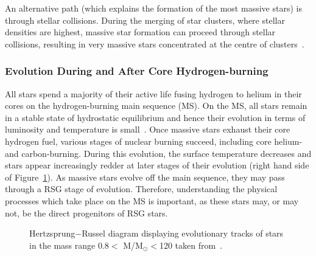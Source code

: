 \documentclass[a4paper,12pt]{article}
\begin{document}
An alternative path (which explains the formation of the most massive stars) is through stellar collisions.
During the merging of star clusters, where stellar densities are highest, massive star formation can proceed through stellar collisions, resulting in very massive stars concentrated at the centre of clusters~\citep{Fujii13}.



\subsubsection{Evolution During and After Core Hydrogen-burning}\label{stellar evolution}

All stars spend a majority of their active life fusing hydrogen to helium in their cores on the hydrogen-burning main sequence (MS).
On the MS, all stars remain in a stable state of hydrostatic equilibrium and hence their evolution in terms of luminosity and temperature is small~\citep{b:KippenhahnWeigert}. 
Once massive stars exhaust their core hydrogen fuel, various stages of nuclear burning succeed, including core helium- and carbon-burning.
During this evolution, the surface temperature decreases and stars appear increasingly redder at later stages of their evolution (right hand side of Figure~\ref{HRD}).
As massive stars evolve off the main sequence, they may pass through a RSG stage of evolution. 
Therefore, understanding the physical processes which take place on the MS is important, as these stars may, or may not, be the direct progenitors of RSG stars.
\begin{figure}[t]
  \begin{center}
  \epsfxsize=100mm         %
  \caption{Hertzsprung$-$Russel diagram displaying evolutionary tracks of stars in the mass range 0.8$<$ M/M$_{\odot}$$<$120 taken from~\cite{Ekstrom12}.}
    \label{HRD}
    \end{center}
 \end{figure}
\end{document}
